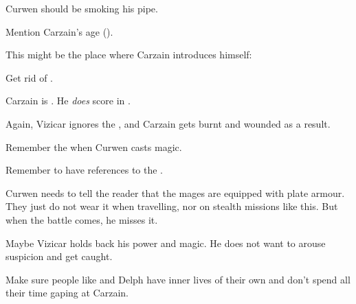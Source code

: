 \begin{garbage}
\begin{changes}
    Curwen should be smoking his pipe. 
    
    Mention Carzain's age (). 
    
    This might be the place where Carzain introduces himself:
  
  \begin{comment}\paragraph{\Forklin}\end{comment}
  \changesitem{\Forklin} 
    Get rid of \Racel. 
    
    Carzain is . 
    He \emph{does} score in \Forklin.  
  
  \begin{comment}
  \paragraph{The Emperor Inviolate}
  \end{comment}
    Again, Vizicar ignores the , and Carzain gets burnt and wounded as a result. 
    
    Remember the  when Curwen casts magic. 
    
    Remember to have references to the \hs{\shechinah}. 
    
    Curwen needs to tell the reader that the \ishrah{} mages are equipped with plate armour. 
    They just do not wear it when travelling, nor on stealth missions like this. 
    But when the battle comes, he misses it. 
    
    Maybe Vizicar holds back his power and magic. 
    He does not want to arouse suspicion and get caught. 
  
  \begin{comment}\paragraph{\Tsekkect{} and Delph}\end{comment}
    Make sure people like \Tsekkect{} and Delph have inner lives of their own and don't spend all their time gaping at Carzain. 
\end{changes}

















\end{garbage}
